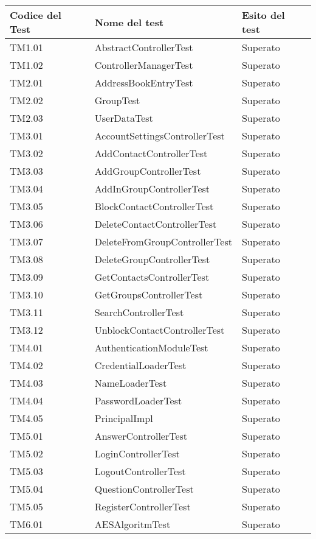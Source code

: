 \begin{center}
\begin{longtable}{p{}ll}
\toprule Codice del Test & Nome del test  & Esito del test\\
\midrule

TM1.01 & AbstractControllerTest &Superato\\
TM1.02 & ControllerManagerTest &Superato\\
TM2.01 & AddressBookEntryTest &Superato\\
TM2.02 & GroupTest &Superato\\
TM2.03 & UserDataTest &Superato\\
TM3.01 & AccountSettingsControllerTest &Superato\\
TM3.02 & AddContactControllerTest &Superato\\
TM3.03 & AddGroupControllerTest &Superato\\
TM3.04 & AddInGroupControllerTest &Superato\\
TM3.05 & BlockContactControllerTest &Superato\\
TM3.06 & DeleteContactControllerTest &Superato\\
TM3.07 & DeleteFromGroupControllerTest &Superato\\
TM3.08 & DeleteGroupControllerTest &Superato\\
TM3.09 & GetContactsControllerTest &Superato\\
TM3.10 & GetGroupsControllerTest &Superato\\
TM3.11 & SearchControllerTest &Superato\\
TM3.12 & UnblockContactControllerTest &Superato\\
TM4.01 & AuthenticationModuleTest &Superato\\
TM4.02 & CredentialLoaderTest &Superato\\
TM4.03 & NameLoaderTest &Superato\\
TM4.04 & PasswordLoaderTest &Superato\\
TM4.05 & PrincipalImpl &Superato\\
TM5.01 & AnswerControllerTest &Superato\\
TM5.02 & LoginControllerTest &Superato\\
TM5.03 & LogoutControllerTest &Superato\\
TM5.04 & QuestionControllerTest &Superato\\
TM5.05 & RegisterControllerTest &Superato\\
TM6.01 & AESAlgoritmTest &Superato\\

\end{longtable}
\end{center}
